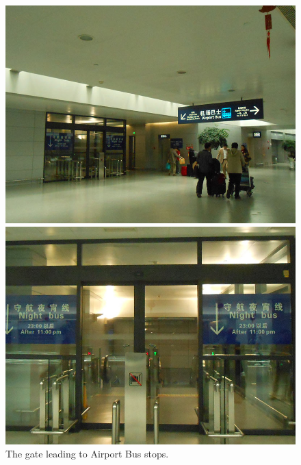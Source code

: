 \documentclass[11pt]{article}
\begin{document}
\begin{figure}[!h]
	\begin{minipage}[t]{.5\textwidth}
     	\centering
        	\includegraphics{image012.jpg}
	\end{minipage}%
     \begin{minipage}[t]{.5\textwidth}
         \centering
         \includegraphics[scale=1.0]{image014.jpg}
    \end{minipage}%
	\caption{The gate leading to Airport Bus stops.\label{pic5}}
 \end{figure}
\end{document}

